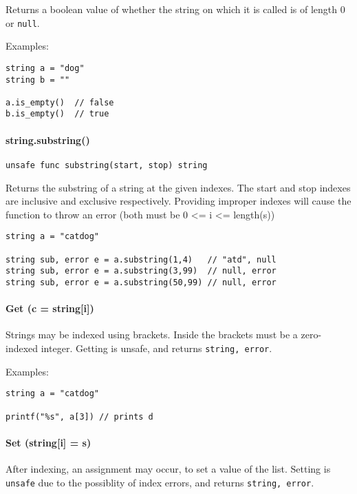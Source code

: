 \documentclass[]{article}
\begin{document}
Returns a boolean value of whether the string on which it is called is
of length 0 or \texttt{null}.

Examples:

\begin{verbatim}
string a = "dog"
string b = ""

a.is_empty()  // false
b.is_empty()  // true
\end{verbatim}

\paragraph{string.substring()}\label{string.substring}

\begin{verbatim}
unsafe func substring(start, stop) string
\end{verbatim}

Returns the substring of a string at the given indexes. The start and
stop indexes are inclusive and exclusive respectively. Providing
improper indexes will cause the function to throw an error (both must be
0 \textless{}= i \textless{}= length(s))

\begin{verbatim}
string a = "catdog"

string sub, error e = a.substring(1,4)   // "atd", null
string sub, error e = a.substring(3,99)  // null, error
string sub, error e = a.substring(50,99) // null, error
\end{verbatim}

\paragraph{Get (c = string{[}i{]})}\label{get-c-stringi}

Strings may be indexed using brackets. Inside the brackets must be a
zero-indexed integer. Getting is unsafe, and returns
\texttt{string, error}.

Examples:

\begin{verbatim}
string a = "catdog"

printf("%s", a[3]) // prints d
\end{verbatim}

\paragraph{Set (string{[}i{]} = s)}\label{set-stringi-s}

After indexing, an assignment may occur, to set a value of the list.
Setting is \texttt{unsafe} due to the possiblity of index errors, and
returns \texttt{string, error}.
\end{document}
